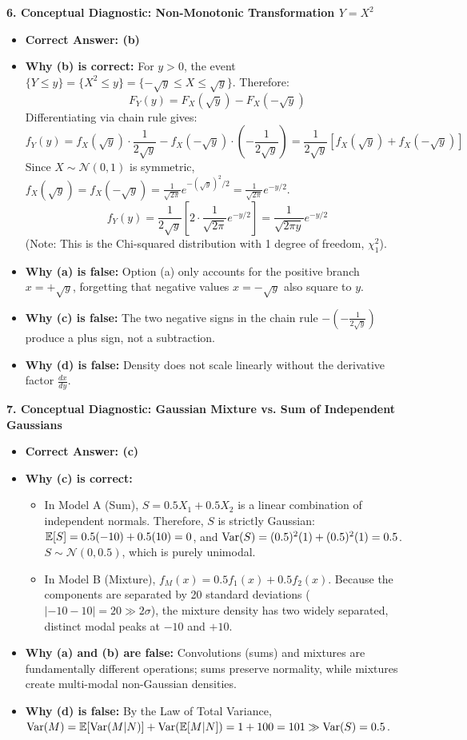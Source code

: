\textbf{6. Conceptual Diagnostic: Non-Monotonic Transformation $Y = X^2$}
\begin{itemize}
    \item \textbf{Correct Answer: (b)}
    \item \textbf{Why (b) is correct:} For $y > 0$, the event $\{Y \le y\} = \{X^2 \le y\} = \{-\sqrt{y} \le X \le \sqrt{y}\}$. Therefore:
    $$F_Y(y) = F_X(\sqrt{y}) - F_X(-\sqrt{y})$$
    Differentiating via chain rule gives:
    $$f_Y(y) = f_X(\sqrt{y}) \cdot \frac{1}{2\sqrt{y}} - f_X(-\sqrt{y}) \cdot \left(-\frac{1}{2\sqrt{y}}\right) = \frac{1}{2\sqrt{y}} \left[ f_X(\sqrt{y}) + f_X(-\sqrt{y}) \right]$$
    Since $X \sim \mathcal{N}(0, 1)$ is symmetric, $f_X(\sqrt{y}) = f_X(-\sqrt{y}) = \frac{1}{\sqrt{2\pi}} e^{-(\sqrt{y})^2/2} = \frac{1}{\sqrt{2\pi}} e^{-y/2}$.
    $$f_Y(y) = \frac{1}{2\sqrt{y}} \left[ 2 \cdot \frac{1}{\sqrt{2\pi}} e^{-y/2} \right] = \frac{1}{\sqrt{2\pi y}} e^{-y/2}$$
    (Note: This is the Chi-squared distribution with 1 degree of freedom, $\chi^2_1$).
    \item \textbf{Why (a) is false:} Option (a) only accounts for the positive branch $x = +\sqrt{y}$, forgetting that negative values $x = -\sqrt{y}$ also square to $y$.
    \item \textbf{Why (c) is false:} The two negative signs in the chain rule $-\left(-\frac{1}{2\sqrt{y}}\right)$ produce a plus sign, not a subtraction.
    \item \textbf{Why (d) is false:} Density does not scale linearly without the derivative factor $\frac{dx}{dy}$.
\end{itemize}

\textbf{7. Conceptual Diagnostic: Gaussian Mixture vs. Sum of Independent Gaussians}
\begin{itemize}
    \item \textbf{Correct Answer: (c)}
    \item \textbf{Why (c) is correct:} 
    \begin{itemize}
        \item In Model A (Sum), $S = 0.5 X_1 + 0.5 X_2$ is a linear combination of independent normals. Therefore, $S$ is strictly Gaussian: $\mathbb{E}[S] = 0.5(-10) + 0.5(10) = 0$, and $\operatorname{Var}(S) = (0.5)^2(1) + (0.5)^2(1) = 0.5$. $S \sim \mathcal{N}(0, 0.5)$, which is purely unimodal.
        \item In Model B (Mixture), $f_M(x) = 0.5 f_1(x) + 0.5 f_2(x)$. Because the components are separated by 20 standard deviations ($|-10 - 10| = 20 \gg 2\sigma$), the mixture density has two widely separated, distinct modal peaks at $-10$ and $+10$.
    \end{itemize}
    \item \textbf{Why (a) and (b) are false:} Convolutions (sums) and mixtures are fundamentally different operations; sums preserve normality, while mixtures create multi-modal non-Gaussian densities.
    \item \textbf{Why (d) is false:} By the Law of Total Variance, $\operatorname{Var}(M) = \mathbb{E}[\operatorname{Var}(M|N)] + \operatorname{Var}(\mathbb{E}[M|N]) = 1 + 100 = 101 \gg \operatorname{Var}(S) = 0.5$.
\end{itemize}

